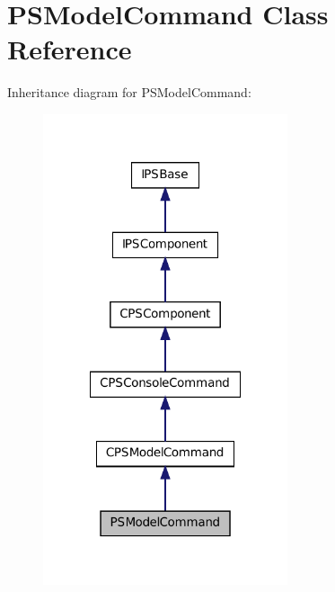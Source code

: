 \hypertarget{classPSModelCommand}{
\section{PSModelCommand Class Reference}
\label{classPSModelCommand}
}


Inheritance diagram for PSModelCommand:\nopagebreak
\begin{figure}[H]
\begin{center}
\leavevmode
\includegraphics[width=204pt]{classPSModelCommand__inherit__graph}
\end{center}
\end{figure}


